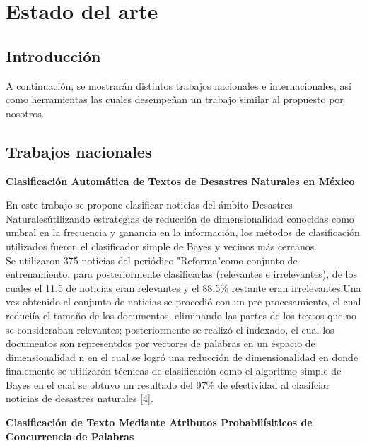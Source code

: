 
\chapter{Estado del arte}

\section{Introducción}

A continuación, se mostrarán distintos trabajos nacionales e internacionales, así como herramientas las cuales desempeñan un trabajo similar al propuesto por nosotros.

\section{Trabajos nacionales}

\begin{large}
	 \textbf{Clasificación Automática de Textos de Desastres Naturales en México}\\
\end{large}

En este trabajo se propone clasificar noticias del ámbito \'Desastres Naturales\' utilizando estrategias de reducción de dimensionalidad conocidas como umbral en la frecuencia y ganancia en la información, los métodos de clasificación utilizados fueron el clasificador simple de Bayes y vecinos más cercanos.\\

Se utilizaron 375 noticias del periódico "Reforma"como conjunto de entrenamiento, para posteriormente clasificarlas (relevantes e irrelevantes), de los cuales el 11.5 de noticias eran relevantes y el 88.5\% restante eran irrelevantes.Una vez obtenido el conjunto de noticias se procedió con un pre-procesamiento, el cual reduciía el tamaño de los documentos, eliminando las partes de los textos que no se consideraban relevantes; posteriormente se realizó el indexado, el cual los documentos son representdos por vectores de palabras en un espacio de dimensionalidad n en el cual se logró una reducción de dimensionalidad en donde finalemente se utilizarón técnicas de clasificación como el algoritmo simple de Bayes en el cual se obtuvo un resultado del 97\% de efectividad al clasifciar noticias de desastres naturales [4].\\

\begin{large}
	 \textbf{Clasificación de Texto Mediante Atributos Probabilísiticos de Concurrencia de Palabras}\\
\end{large}
	
